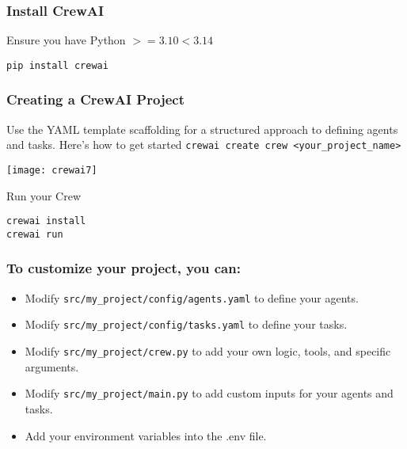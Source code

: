\begin{frame}[fragile]\frametitle{Install CrewAI }

Ensure you have Python $>=3.10 <3.14$


    \begin{lstlisting}
pip install crewai
    \end{lstlisting}			
\end{frame}


\begin{frame}[fragile]\frametitle{Creating a CrewAI Project}

Use the YAML template scaffolding for a structured approach to defining agents and tasks. Here’s how to get started \lstinline|crewai create crew <your_project_name>|


		\begin{center}
		\texttt{[image: crewai7]}
		\end{center}
		
Run your Crew		
    \begin{lstlisting}
crewai install
crewai run
    \end{lstlisting}			
\end{frame}


\begin{frame}[fragile]\frametitle{To customize your project, you can:}

    \begin{itemize}
        \item Modify \lstinline|src/my_project/config/agents.yaml| to define your agents.
        \item Modify \lstinline|src/my_project/config/tasks.yaml| to define your tasks.
        \item Modify \lstinline|src/my_project/crew.py| to add your own logic, tools, and specific arguments.
        \item Modify \lstinline|src/my_project/main.py| to add custom inputs for your agents and tasks.
        \item Add your environment variables into the .env file.
    \end{itemize}
\end{frame}


